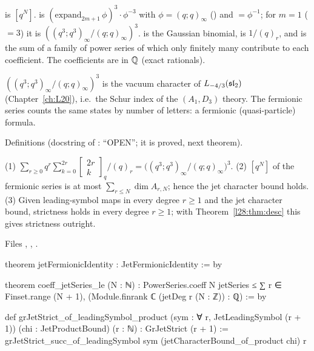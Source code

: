 \begin{dictionary}
 is $[q^N]$.  is $(\mathrm{expand}_{2m+1}\,\phi)^3\cdot\phi^{-3}$ with $\phi=(q;q)_\infty$ () and
$=\phi^{-1}$; for $m=1$ ($=3$) it is $((q^3;q^3)_\infty/(q;q)_\infty)^3$.  is the
Gaussian binomial,  is $1/(q)_r$, and  is the sum of a family of power series of which
only finitely many contribute to each coefficient. The coefficients are in ${\mathbb{Q}}$ (exact rationals).
\end{dictionary}

\begin{physics}
$((q^3;q^3)_\infty/(q;q)_\infty)^3$ is the vacuum character of $L_{-4/3}(\mathfrak{sl}_2)$ (Chapter~\ref{ch:L20}), i.e.\ the Schur index of the $(A_1,D_3)$
theory. The fermionic series counts the same states by number of letters: a fermionic (quasi-particle) formula.
\end{physics}

\begin{status}
Definitions (docstring of : ``OPEN''; it is proved, next theorem).
\end{status}

\begin{theorem}\label{l28:thm:jetfermionic}
(1) $\sum_{r\ge0}q^r\sum_{k=0}^{2r}\left[\begin{smallmatrix}2r\\k\end{smallmatrix}\right]_q/(q)_r=\bigl((q^3;q^3)_\infty/(q;q)_\infty\bigr)^3$.
(2) $[q^N]$ of the fermionic series is at most $\sum_{r\le N}\dim A_{r,N}$; hence the jet character bound holds. (3) Given leading-symbol maps in every degree
$r\ge1$ and the jet character bound, strictness holds in every degree $r\ge1$; with Theorem~\ref{l28:thm:desc} this gives strictness outright.
\end{theorem}

\noindent Files , ,
.
\begin{leancode}
theorem jetFermionicIdentity : JetFermionicIdentity := by

theorem coeff_jetSeries_le (N : ℕ) :
    PowerSeries.coeff N jetSeries ≤
      ∑ r ∈ Finset.range (N + 1), (Module.finrank ℂ (jetDeg r (N : ℤ)) : ℚ) := by

def grJetStrict_of_leadingSymbol_product (sym : ∀ r, JetLeadingSymbol (r + 1))
    (chi : JetProductBound) (r : ℕ) : GrJetStrict (r + 1) :=
  grJetStrict_succ_of_leadingSymbol sym (jetCharacterBound_of_product chi) r
\end{leancode}

